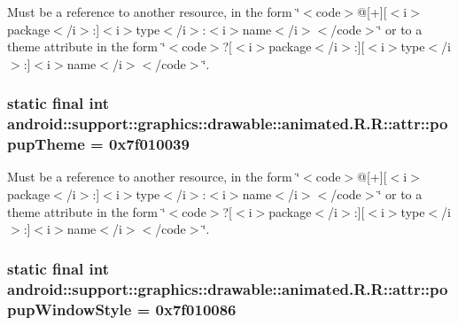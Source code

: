 Must be a reference to another resource, in the form \char`\"{}$<$code$>$@\mbox{[}+\mbox{]}\mbox{[}$<$i$>$package$<$/i$>$:\mbox{]}$<$i$>$type$<$/i$>$:$<$i$>$name$<$/i$>$$<$/code$>$\char`\"{} or to a theme attribute in the form \char`\"{}$<$code$>$?\mbox{[}$<$i$>$package$<$/i$>$:\mbox{]}\mbox{[}$<$i$>$type$<$/i$>$:\mbox{]}$<$i$>$name$<$/i$>$$<$/code$>$\char`\"{}. \hypertarget{classandroid_1_1support_1_1graphics_1_1drawable_1_1animated_1_1_r_1_1attr_043a7a6b0810ad150499fbb38dd1496b}{
\subsubsection[{popupTheme}]{\setlength{\rightskip}{0pt plus 5cm}static final int android::support::graphics::drawable::animated.R.R::attr::popupTheme = 0x7f010039}}
\label{classandroid_1_1support_1_1graphics_1_1drawable_1_1animated_1_1_r_1_1attr_043a7a6b0810ad150499fbb38dd1496b}


Must be a reference to another resource, in the form \char`\"{}$<$code$>$@\mbox{[}+\mbox{]}\mbox{[}$<$i$>$package$<$/i$>$:\mbox{]}$<$i$>$type$<$/i$>$:$<$i$>$name$<$/i$>$$<$/code$>$\char`\"{} or to a theme attribute in the form \char`\"{}$<$code$>$?\mbox{[}$<$i$>$package$<$/i$>$:\mbox{]}\mbox{[}$<$i$>$type$<$/i$>$:\mbox{]}$<$i$>$name$<$/i$>$$<$/code$>$\char`\"{}. \hypertarget{classandroid_1_1support_1_1graphics_1_1drawable_1_1animated_1_1_r_1_1attr_60538fdbd74060c7bdcec88537888afd}{
\subsubsection[{popupWindowStyle}]{\setlength{\rightskip}{0pt plus 5cm}static final int android::support::graphics::drawable::animated.R.R::attr::popupWindowStyle = 0x7f010086}}
\label{classandroid_1_1support_1_1graphics_1_1drawable_1_1animated_1_1_r_1_1attr_60538fdbd74060c7bdcec88537888afd}


